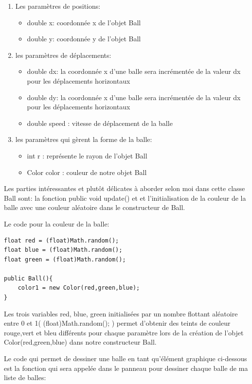 \documentclass{article}
\begin{document}
\begin{enumerate}
\item Les paramètres de positions:
\begin{itemize}
\item double x: coordonnée x de l'objet Ball
\item double y: coordonnée y de l'objet Ball
\end{itemize}

\item les paramètres de déplacements:
\begin{itemize}
\item double dx: la coordonnée x d'une balle sera incrémentée de la valeur dx pour les déplacements horizontaux
\item double dy: la coordonnée x d'une balle sera incrémentée de la valeur dx pour les déplacements horizontaux
\item double speed : vitesse de déplacement de la balle
\end{itemize}

\item les paramètres qui gèrent la forme de la balle:
\begin{itemize}
\item int r : représente le rayon de l'objet Ball
\item Color color : couleur de notre objet Ball
\end{itemize}
\end{enumerate}

Les parties intéressantes et plut\^ot délicates à aborder selon moi dans cette classe Ball sont:
la fonction public void update() et et l'initialisation de la couleur de la balle avec une couleur aléatoire dans le constructeur de Ball.
\newpage

Le code pour la couleur de la balle:
\begin{verbatim}
float red = (float)Math.random();
float blue = (float)Math.random();
float green = (float)Math.random();
	
public Ball(){
    color1 = new Color(red,green,blue);
}
\end{verbatim}
Les trois variables red, blue, green initialisées par un nombre flottant aléatoire entre 0 et 1( (float)Math.random(); ) permet d'obtenir des teints de couleur rouge,vert et bleu différents pour chaque paramètre lors de la création de l'objet Color(red,green,blue) dans notre constructeur Ball.
\vspace{5mm}

Le code qui permet de dessiner une balle en tant qu'élément graphique ci-dessous est la fonction qui sera appelée dans le panneau pour dessiner chaque balle de ma liste de balles:
\end{document}
